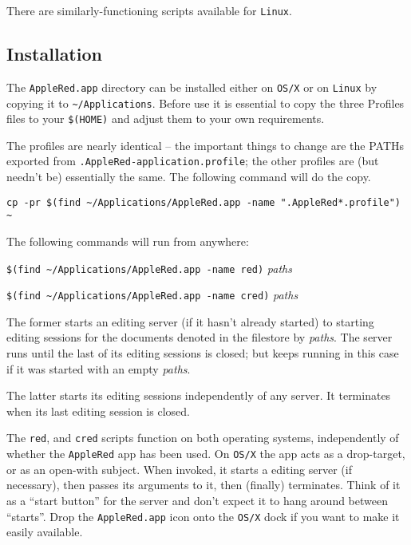 \documentclass[
]{article}
\begin{document}
There are similarly-functioning scripts available for \texttt{Linux}.

\hypertarget{installation}{%
\subsection{Installation}\label{installation}}

The \texttt{AppleRed.app} directory can be installed either on
\texttt{OS/X} or on \texttt{Linux} by copying it to
\texttt{\textasciitilde{}/Applications}. Before use it is essential to
copy the three Profiles files to your \texttt{\$(HOME)} and adjust them
to your own requirements.

The profiles are nearly identical -- the important things to change are
the PATHs exported from \texttt{.AppleRed-application.profile}; the
other profiles are (but needn't be) essentially the same. The following
command will do the copy.

\begin{verbatim}
cp -pr $(find ~/Applications/AppleRed.app -name ".AppleRed*.profile") ~
\end{verbatim}

The following commands will run from anywhere:

\texttt{\$(find\ \textasciitilde{}/Applications/AppleRed.app\ -name\ red)}
\emph{paths}

\texttt{\$(find\ \textasciitilde{}/Applications/AppleRed.app\ -name\ cred)}
\emph{paths}

The former starts an editing server (if it hasn't already started) to
starting editing sessions for the documents denoted in the filestore by
\emph{paths}. The server runs until the last of its editing sessions is
closed; but keeps running in this case if it was started with an empty
\emph{paths}.

The latter starts its editing sessions independently of any server. It
terminates when its last editing session is closed.

The \texttt{red}, and \texttt{cred} scripts function on both operating
systems, independently of whether the \texttt{AppleRed} app has been
used. On \texttt{OS/X} the app acts as a drop-target, or as an open-with
subject. When invoked, it starts a editing server (if necessary), then
passes its arguments to it, then (finally) terminates. Think of it as a
``start button'' for the server and don't expect it to hang around
between ``starts''. Drop the \texttt{AppleRed.app} icon onto the
\texttt{OS/X} dock if you want to make it easily available.
\end{document}
